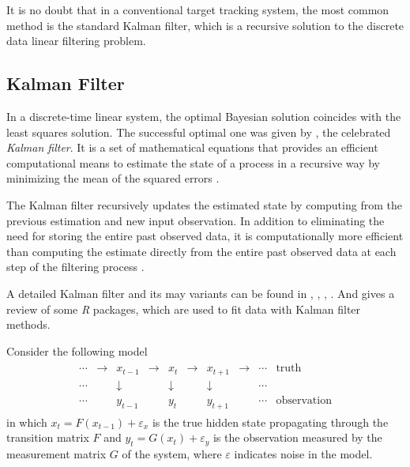 It is no doubt that in a conventional target tracking system, the most common method is the standard Kalman filter, which is a recursive solution to the discrete data linear filtering problem. 



\subsection*{Kalman Filter}

In a discrete-time linear system, the optimal Bayesian solution coincides with the least squares solution. The successful optimal one was given by \cite{kalman1960new}, the celebrated \textit{Kalman filter}. It is a set of mathematical equations that provides an efficient computational means to estimate the state of a process in a recursive way by minimizing the mean of the squared errors \cite{bishop2001introduction}. 

The Kalman filter recursively updates the estimated state by computing from the previous estimation and new input observation. In addition to eliminating the need for storing the entire past observed data, it is computationally more efficient than computing the estimate directly from the entire past observed data at each step of the filtering process \cite{haykin2001kalman}. 

A detailed Kalman filter and its may variants can be found in \cite{chen2003bayesian}, \cite{rhodes1971tutorial}, \cite{kailath1981lectures}, \cite{sorenson1985kalman}. And  \cite{tusell2011kalman} gives a review of some \textit{R} packages, which are used to fit data with Kalman filter methods. 

Consider the following model 
\begin{align}\label{introKFmodel}
\begin{array}{cccccccccc}\cdots &\to &x_{t-1}&\to &x_{t}&\to &x_{t+1}&\to &\cdots &{\text{truth}}\\ \cdots &&\downarrow &&\downarrow &&\downarrow &&\cdots &\\ \cdots&&y_{t-1}&&y_{t}&&y_{t+1}&&\cdots &{\text{observation}}\end{array}
 \end{align}
in which $x_t=F(x_{t-1})+\varepsilon_x$ is the true hidden state propagating through the transition matrix $F$ and $y_t=G(x_t)+\varepsilon_y$ is the observation measured by the measurement matrix $G$ of the system, where $\varepsilon$ indicates \iid noise in the model. 

